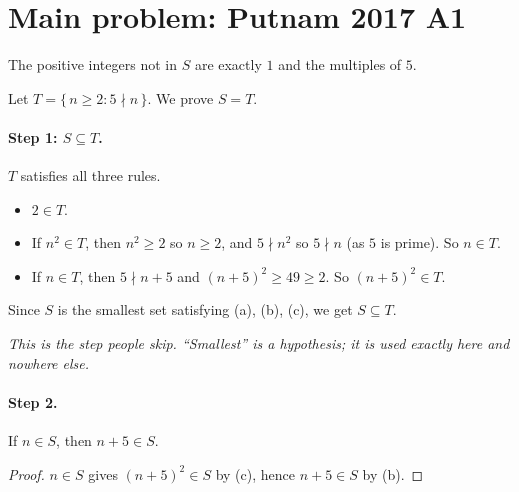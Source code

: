 \documentclass[11pt]{article}
\begin{document}

\section*{Main problem: Putnam 2017 A1}

\begin{answer}
The positive integers not in $S$ are exactly $1$ and the multiples of $5$.
\end{answer}

Let $T = \{\, n \ge 2 : 5 \nmid n \,\}$. We prove $S = T$.

\paragraph{Step 1: $S \subseteq T$.} $T$ satisfies all three rules.
\begin{itemize}
  \item[(a)] $2 \in T$.
  \item[(b)] If $n^2 \in T$, then $n^2 \ge 2$ so $n \ge 2$, and $5 \nmid n^2$ so $5 \nmid n$ (as $5$ is prime). So $n \in T$.
  \item[(c)] If $n \in T$, then $5 \nmid n+5$ and $(n+5)^2 \ge 49 \ge 2$. So $(n+5)^2 \in T$.
\end{itemize}
Since $S$ is the smallest set satisfying (a), (b), (c), we get $S \subseteq T$.

\emph{This is the step people skip. ``Smallest'' is a hypothesis; it is used exactly here and nowhere else.}

\paragraph{Step 2.}
\begin{lemma}
If $n \in S$, then $n + 5 \in S$.
\end{lemma}
\begin{proof}
$n \in S$ gives $(n+5)^2 \in S$ by (c), hence $n+5 \in S$ by (b).
\end{proof}
\end{document}
